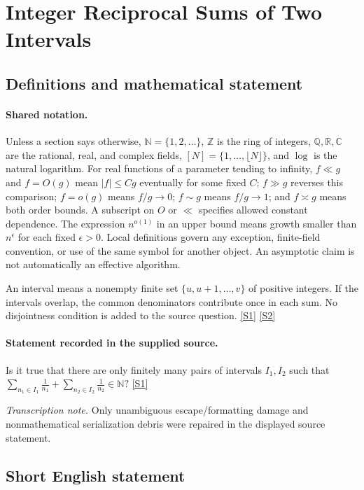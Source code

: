 \documentclass[11pt,a4paper]{article}
\newcommand{\N}{\mathbb{N}}
\newcommand{\Z}{\mathbb{Z}}
\newcommand{\Q}{\mathbb{Q}}
\newcommand{\R}{\mathbb{R}}
\newcommand{\C}{\mathbb{C}}
\newcommand{\sref}[2]{\hyperlink{source:#1:#2}{[S#2]}}
\begin{document}
\section{Integer Reciprocal Sums of Two Intervals}\label{statement}


\subsection{Definitions and mathematical statement}

\paragraph{Shared notation.}Unless a section says otherwise, $\N=\{1,2,\ldots\}$,
$\Z$ is the ring of integers, $\Q,\R,\C$ are the rational, real, and complex
fields, $[N]=\{1,\ldots,\lfloor N\rfloor\}$, and $\log$ is the natural
logarithm. For real functions of a parameter tending to infinity,
$f\ll g$ and $f=O(g)$ mean $|f|\leq Cg$ eventually for some fixed $C$;
$f\gg g$ reverses this comparison; $f=o(g)$ means $f/g\to0$;
$f\sim g$ means $f/g\to1$; and $f\asymp g$ means both order bounds.
A subscript on $O$ or $\ll$ specifies allowed constant dependence.
The expression $n^{o(1)}$ in an upper bound means growth smaller than
$n^\epsilon$ for each fixed $\epsilon>0$. Local definitions govern any
exception, finite-field convention, or use of the same symbol for another
object. An asymptotic claim is not automatically an effective algorithm.



An interval means a nonempty finite set $\{u,u+1,\ldots,v\}$ of positive integers. If the intervals overlap, the common denominators contribute once in each sum. No disjointness condition is added to the source question. \sref{statement}{1} \sref{statement}{2}

\paragraph{Statement recorded in the supplied source.}
Is it true that there are only finitely many pairs of intervals $I_1,I_2$ such that $ \sum_{n_1\in I_1}\frac{1}{n_1}+\sum_{n_2\in I_2}\frac{1}{n_2}\in \mathbb{N}? $ \sref{statement}{1}

{\small\emph{Transcription note.} Only unambiguous escape/formatting damage and nonmathematical serialization debris were repaired in the displayed source statement.}

\subsection{Short English statement}
\end{document}
